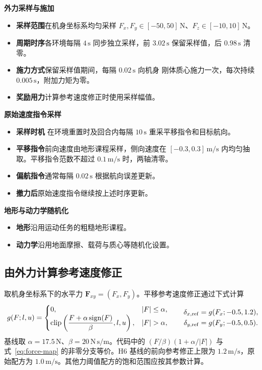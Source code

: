 \noindent\textbf{外力采样与施加}
\begin{itemize}
  \item \textbf{采样范围}\enspace 在机身坐标系均匀采样 $F_x,F_y\in[-50,50]\,\mathrm N$、$F_z\in[-10,10]\,\mathrm N$。
  \item \textbf{周期时序}\enspace 各环境每隔 $4\,\mathrm{s}$ 同步独立采样，前 $3.02\,\mathrm{s}$ 保留采样值，后 $0.98\,\mathrm{s}$ 清零。
  \item \textbf{施力方式}\enspace 保留采样值期间，每隔 $0.02\,\mathrm{s}$ 向机身  刚体质心施力一次，每次持续 $0.005\,\mathrm{s}$，附加力矩为零。
  \item \textbf{奖励用力}\enspace 计算参考速度修正时使用采样幅值。
\end{itemize}

\noindent\textbf{原始速度指令采样}
\begin{itemize}
  \item \textbf{采样时机}\enspace {} 在环境重置时及回合内每隔 $10\,\mathrm{s}$ 重采平移指令和目标航向。
  \item \textbf{平移指令}\enspace 前向速度由地形课程采样，侧向速度在 $[-0.3,0.3]\,\mathrm{m/s}$ 内均匀抽取。平移指令范数不超过 $0.1\,\mathrm{m/s}$ 时，两轴清零。
  \item \textbf{偏航指令}\enspace 通常每隔 $0.02\,\mathrm{s}$ 根据航向误差更新。
  \item \textbf{撤力后}\enspace 原始速度指令继续按上述时序更新。
\end{itemize}

\noindent\textbf{地形与动力学随机化}
\begin{itemize}
  \item \textbf{地形}\enspace 沿用运动任务的粗糙地形课程。
  \item \textbf{动力学}\enspace 沿用地面摩擦、载荷与质心等随机化设置。
\end{itemize}

\subsection{由外力计算参考速度修正}

取机身坐标系下的水平力 $\bm F_{xy}=(F_x,F_y)$。平移参考速度修正通过下式计算
\begin{equation}
 g(F;l,u)=\begin{cases}
 0,& |F|\le\alpha,\\
 \clip\left(\dfrac{F+\alpha\sgn(F)}{\beta},l,u\right),&|F|>\alpha,
 \end{cases}
 \qquad
 \begin{aligned}
 \delta_{x,\rm ref}&=g(F_x;-0.5,1.2),\\
 \delta_{y,\rm ref}&=g(F_y;-0.5,0.5).
 \end{aligned}
\label{eq:force-map}
\end{equation}
基线取 $\alpha=17.5\,\mathrm N$、$\beta=20\,\mathrm{N\,s/m}$。代码中的 $(F/\beta)(1+\alpha/|F|)$ 与式~\eqref{eq:force-map} 的非零分支等价。H6  基线的前向参考修正上限为 $1.2\,\mathrm{m/s}$，原始配方为 $1.0\,\mathrm{m/s}$。其他力阈值配方的饱和范围应按其参数计算。

